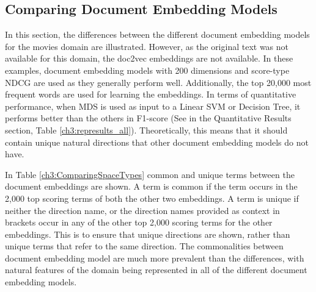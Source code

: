 \subsection{Comparing Document Embedding Models}\label{ch3:differentembeddingmodels}

In this section, the differences between the different document embedding models for the movies domain are illustrated.  However, as the original text was not available for this domain, the  doc2vec embeddings are not available. In these examples, document embedding models with  200 dimensions and score-type NDCG are used as they generally perform well. Additionally, the top 20,000 most frequent words are used  for learning the embeddings. In terms of quantitative performance,  when MDS is used as input to a Linear SVM or Decision Tree, it performs better than the others in F1-score (See in the Quantitative Results section, Table \ref{ch3:represults_all}). Theoretically, this means that it should contain unique natural directions that other document embedding models do not have. 

In Table \ref{ch3:ComparingSpaceTypes} common and unique terms between the document embeddings are shown. A term  is  common if the term occurs in the 2,000 top scoring terms of both the other two embeddings. A term is unique  if neither the direction name, or the direction names provided as context in brackets occur in any of the other top 2,000 scoring terms for the other embeddings. This is to ensure that unique directions are shown, rather than unique terms that refer to the same direction. The commonalities between document embedding model are much more prevalent than the differences, with natural features of the domain being represented in all of the different document embedding models. 



